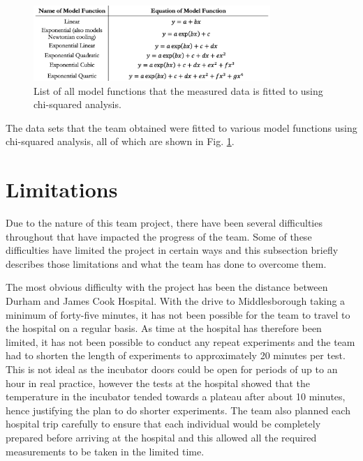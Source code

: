 \documentclass{article}
\begin{document}
\begin{figure}[h!]
    \centering
    \captionsetup{justification=centering,margin=1cm}
    \includegraphics[width=0.8\textwidth]{Model functions table.png}
    \caption{List of all model functions that the measured data is fitted to using chi-squared analysis.}
    \label{ModelFunctTable}
\end{figure}

The data sets that the team obtained were fitted to various model functions using chi-squared analysis, all of which are shown in Fig. \ref{ModelFunctTable}.

\newpage
\section{Limitations}

Due to the nature of this team project, there have been several difficulties throughout that have impacted the progress of the team. Some of these difficulties have limited the project in certain ways and this subsection briefly describes those limitations and what the team has done to overcome them.

\vspace{3mm}

The most obvious difficulty with the project has been the distance between Durham and James Cook Hospital. With the drive to Middlesborough taking a minimum of forty-five minutes, it has not been possible for the team to travel to the hospital on a regular basis. As time at the hospital has therefore been limited, it has not been possible to conduct any repeat experiments and the team had to shorten the length of experiments to approximately 20 minutes per test. This is not ideal as the incubator doors could be open for periods of up to an hour in real practice, however the tests at the hospital showed that the temperature in the incubator tended towards a plateau after about 10 minutes, hence justifying the plan to do shorter experiments. The team also planned each hospital trip carefully to ensure that each individual would be completely prepared before arriving at the hospital and this allowed all the required measurements to be taken in the limited time. 
\end{document}
